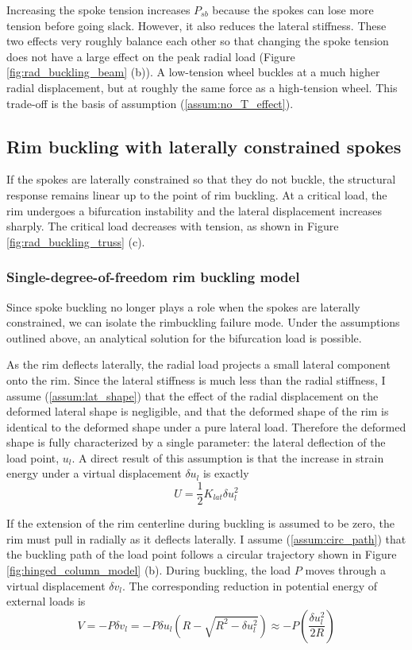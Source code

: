 \documentclass[\rootdir/thesis.tex]{subfiles}
\begin{document}
Increasing the spoke tension increases $P_{sb}$ because the spokes can lose more tension before going slack. However, it also reduces the lateral stiffness. These two effects very roughly balance each other so that changing the spoke tension does not have a large effect on the peak radial load (Figure \ref{fig:rad_buckling_beam} (b)). A low-tension wheel buckles at a much higher radial displacement, but at roughly the same force as a high-tension wheel. This trade-off is the basis of assumption (\ref{assum:no_T_effect}).

\subsection{Rim buckling with laterally constrained spokes}

If the spokes are laterally constrained so that they do not buckle, the structural response remains linear up to the point of rim buckling. At a critical load, the rim undergoes a bifurcation instability and the lateral displacement increases sharply. The critical load decreases with tension, as shown in Figure \ref{fig:rad_buckling_truss} (c).

\subsubsection{Single-degree-of-freedom rim buckling model}

Since spoke buckling no longer plays a role when the spokes are laterally constrained, we can isolate the rimbuckling failure mode. Under the assumptions outlined above, an analytical solution for the bifurcation load is possible.

As the rim deflects laterally, the radial load projects a small lateral component onto the rim. Since the lateral stiffness is much less than the radial stiffness, I assume (\ref{assum:lat_shape}) that the effect of the radial displacement on the deformed lateral shape is negligible, and that the deformed shape of the rim is identical to the deformed shape under a pure lateral load. Therefore the deformed shape is fully characterized by a single parameter: the lateral deflection of the load point, $u_l$. A direct result of this assumption is that the increase in strain energy under a virtual displacement $\delta u_l$ is exactly
\begin{equation}
\label{eq:U_rim_1dof}
U = \frac{1}{2}K_{lat}\delta u_l^2
\end{equation}

If the extension of the rim centerline during buckling is assumed to be zero, the rim must pull in radially as it deflects laterally. I assume (\ref{assum:circ_path}) that the buckling path of the load point follows a circular trajectory shown in Figure \ref{fig:hinged_column_model} (b). During buckling, the load $P$ moves through a virtual displacement $\delta v_l$. The corresponding reduction in potential energy of external loads is
\begin{equation}
\label{eq:V_rim_1dof}
V = -P\delta v_l = -P \delta u_l \left(R - \sqrt{R^2 - \delta u_l^2}\right)
\approx -P \left(\frac{\delta u_l^2}{2R}\right)
\end{equation}
\end{document}
